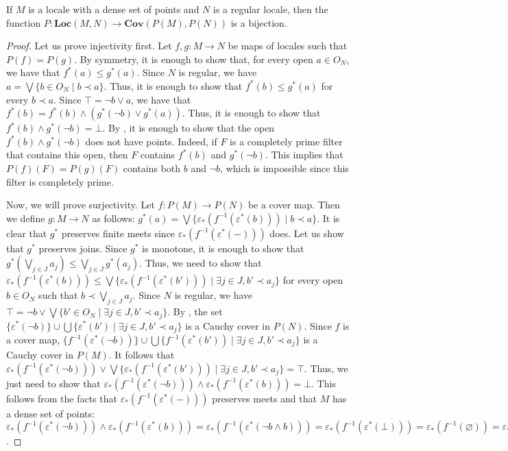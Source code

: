 \documentclass[reqno]{amsart}
\theoremstyle{definition}
\theoremstyle{remark}
\numberwithin{figure}{section}
\newcommand{\rb}{\prec}
\newcommand{\cat}[1]{\mathbf{#1}}
\begin{document}
\begin{prop}[locale-ff]
If $M$ is a locale with a dense set of points and $N$ is a regular locale, then the function $P : \cat{Loc}(M,N) \to \cat{Cov}(P(M),P(N))$ is a bijection.
\end{prop}
\begin{proof}
Let us prove injectivity first.
Let $f,g : M \to N$ be maps of locales such that $P(f) = P(g)$.
By symmetry, it is enough to show that, for every open $a \in O_N$, we have that $f^*(a) \leq g^*(a)$.
Since $N$ is regular, we have $a = \bigvee \{ b \in O_N \mid b \rb a \}$.
Thus, it is enough to show that $f^*(b) \leq g^*(a)$ for every $b \rb a$.
Since $\top = \neg b \vee a$, we have that $f^*(b) = f^*(b) \wedge (g^*(\neg b) \vee g^*(a))$.
Thus, it is enough to show that $f^*(b) \wedge g^*(\neg b) = \bot$.
By , it is enough to show that the open $f^*(b) \wedge g^*(\neg b)$ does not have points.
Indeed, if $F$ is a completely prime filter that contains this open, then $F$ contains $f^*(b)$ and $g^*(\neg b)$.
This implies that $P(f)(F) = P(g)(F)$ contains both $b$ and $\neg b$, which is impossible since this filter is completely prime.

Now, we will prove surjectivity.
Let $f : P(M) \to P(N)$ be a cover map.
Then we define $g : M \to N$ as follows: $g^*(a) = \bigvee \{ \varepsilon_*(f^{-1}(\varepsilon^*(b))) \mid b \rb a \}$.
It is clear that $g^*$ preserves finite meets since $\varepsilon_*(f^{-1}(\varepsilon^*(-)))$ does.
Let us show that $g^*$ preserves joins.
Since $g^*$ is monotone, it is enough to show that $g^*(\bigvee_{j \in J} a_j) \leq \bigvee_{j \in J} g^*(a_j)$.
Thus, we need to show that $\varepsilon_*(f^{-1}(\varepsilon^*(b))) \leq \bigvee \{ \varepsilon_*(f^{-1}(\varepsilon^*(b'))) \mid \exists j \in J, b' \rb a_j \}$ for every open $b \in O_N$ such that $b \rb \bigvee_{j \in J} a_j$.
Since $N$ is regular, we have $\top = \neg b \vee \bigvee \{ b' \in O_N \mid \exists j \in J, b' \rb a_j \}$.
By , the set $\{ \varepsilon^*(\neg b) \} \cup \bigcup \{ \varepsilon^*(b') \mid \exists j \in J, b' \rb a_j \}$ is a Cauchy cover in $P(N)$.
Since $f$ is a cover map, $\{ f^{-1}(\varepsilon^*(\neg b)) \} \cup \bigcup \{ f^{-1}(\varepsilon^*(b')) \mid \exists j \in J, b' \rb a_j \}$ is a Cauchy cover in $P(M)$.
It follows that $\varepsilon_*(f^{-1}(\varepsilon^*(\neg b))) \vee \bigvee \{ \varepsilon_*(f^{-1}(\varepsilon^*(b'))) \mid \exists j \in J, b' \rb a_j \} = \top$.
Thus, we just need to show that $\varepsilon_*(f^{-1}(\varepsilon^*(\neg b))) \wedge \varepsilon_*(f^{-1}(\varepsilon^*(b))) = \bot$.
This follows from the facts that $\varepsilon_*(f^{-1}(\varepsilon^*(-)))$ preserves meets and that $M$ has a dense set of points: $\varepsilon_*(f^{-1}(\varepsilon^*(\neg b))) \wedge \varepsilon_*(f^{-1}(\varepsilon^*(b))) = \varepsilon_*(f^{-1}(\varepsilon^*(\neg b \wedge b))) = \varepsilon_*(f^{-1}(\varepsilon^*(\bot))) = \varepsilon_*(f^{-1}(\varnothing)) = \varepsilon_*(\varnothing) = \bot$.


\end{proof}
\end{document}
